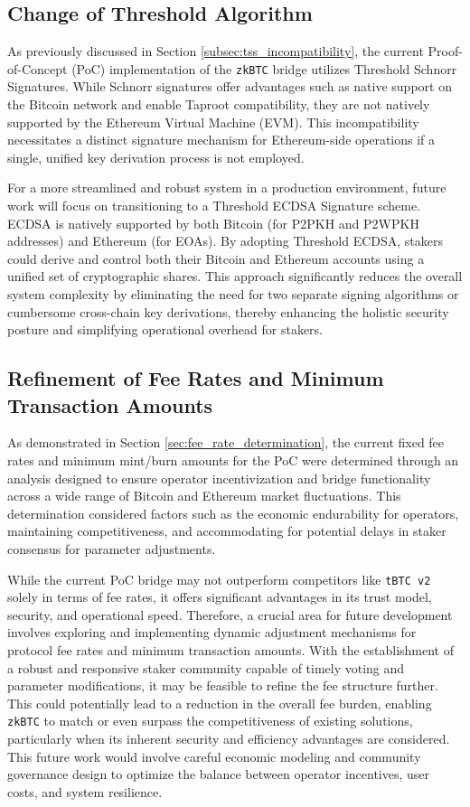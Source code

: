 \documentclass{DESSThesis}
\newcommand{\zktoken}{\texttt{zkBTC}}
\begin{document}
\subsection{Change of Threshold Algorithm} \label{subsec:future_tss_change}
As previously discussed in Section \ref{subsec:tss_incompatibility}, the current Proof-of-Concept (PoC) implementation of the \texttt{\zktoken} bridge utilizes Threshold Schnorr Signatures. While Schnorr signatures offer advantages such as native support on the Bitcoin network and enable Taproot compatibility, they are not natively supported by the Ethereum Virtual Machine (EVM). This incompatibility necessitates a distinct signature mechanism for Ethereum-side operations if a single, unified key derivation process is not employed.

For a more streamlined and robust system in a production environment, future work will focus on transitioning to a Threshold ECDSA Signature scheme. ECDSA is natively supported by both Bitcoin (for P2PKH and P2WPKH addresses) and Ethereum (for EOAs). By adopting Threshold ECDSA, stakers could derive and control both their Bitcoin and Ethereum accounts using a unified set of cryptographic shares. This approach significantly reduces the overall system complexity by eliminating the need for two separate signing algorithms or cumbersome cross-chain key derivations, thereby enhancing the holistic security posture and simplifying operational overhead for stakers.

\subsection{Refinement of Fee Rates and Minimum Transaction Amounts} \label{subsec:future_fee_refinement}
As demonstrated in Section \ref{sec:fee_rate_determination}, the current fixed fee rates and minimum mint/burn amounts for the PoC were determined through an analysis designed to ensure operator incentivization and bridge functionality across a wide range of Bitcoin and Ethereum market fluctuations. This determination considered factors such as the economic endurability for operators, maintaining competitiveness, and accommodating for potential delays in staker consensus for parameter adjustments.

While the current PoC bridge may not outperform competitors like \texttt{tBTC v2} solely in terms of fee rates, it offers significant advantages in its trust model, security, and operational speed. Therefore, a crucial area for future development involves exploring and implementing dynamic adjustment mechanisms for protocol fee rates and minimum transaction amounts. With the establishment of a robust and responsive staker community capable of timely voting and parameter modifications, it may be feasible to refine the fee structure further. This could potentially lead to a reduction in the overall fee burden, enabling \texttt{\zktoken} to match or even surpass the competitiveness of existing solutions, particularly when its inherent security and efficiency advantages are considered. This future work would involve careful economic modeling and community governance design to optimize the balance between operator incentives, user costs, and system resilience.
\end{document}
